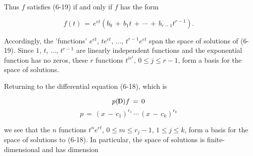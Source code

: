 Thus \(f\) satisfies (6-19) if and only if \(f\) has the form

\[f(t)\,=\,e^{et}(b_{0}\,+\,b_{1}t\,+\,\cdots\,+\,b_{r-1}t^{r-1}).\]

Accordingly, the 'functions' \(e^{et}\), \(te^{et}\), \(\ldots\), \(t^{r-1}e^{et}\) span the space of solutions of (6-19). Since \(1\), \(t\), \(\ldots\), \(t^{r-1}\) are linearly independent functions and the exponential function has no zeros, these \(r\) functions \(t^{ie^{t}}\), \(0\leq j\leq r-1\), form a basis for the space of solutions.

Returning to the differential equation (6-18), which is

\[p(\,\hbox{\vrule height 6.5pt width 0.4pt depth 0.0pt\kern-3.0ptD})f\,=\,0\] \[p\,=\,(x\,-\,c_{1})^{r_{1}}\,\cdots\,(x\,-\,c_{k})^{r_{k}}\]

we see that the \(n\) functions \(t^{n}e^{et}\), \(0\leq m\leq r_{j}-1\), \(1\leq j\leq k\), form a basis for the space of solutions to (6-18). In particular, the space of solutions is finite-dimensional and has dimension 